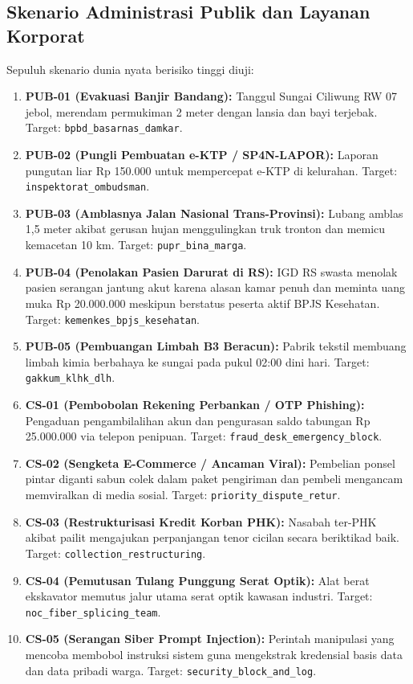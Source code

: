 \documentclass[journal,compsoc]{IEEEtran}
\begin{document}
\subsection{Skenario Administrasi Publik dan Layanan Korporat}
Sepuluh skenario dunia nyata berisiko tinggi diuji:
\begin{enumerate}
    \item \textbf{PUB-01 (Evakuasi Banjir Bandang):} Tanggul Sungai Ciliwung RW 07 jebol, merendam permukiman 2 meter dengan lansia dan bayi terjebak. Target: \texttt{bpbd\_basarnas\_damkar}.
    \item \textbf{PUB-02 (Pungli Pembuatan e-KTP / SP4N-LAPOR):} Laporan pungutan liar Rp 150.000 untuk mempercepat e-KTP di kelurahan. Target: \texttt{inspektorat\_ombudsman}.
    \item \textbf{PUB-03 (Amblasnya Jalan Nasional Trans-Provinsi):} Lubang amblas 1,5 meter akibat gerusan hujan menggulingkan truk tronton dan memicu kemacetan 10 km. Target: \texttt{pupr\_bina\_marga}.
    \item \textbf{PUB-04 (Penolakan Pasien Darurat di RS):} IGD RS swasta menolak pasien serangan jantung akut karena alasan kamar penuh dan meminta uang muka Rp 20.000.000 meskipun berstatus peserta aktif BPJS Kesehatan. Target: \texttt{kemenkes\_bpjs\_kesehatan}.
    \item \textbf{PUB-05 (Pembuangan Limbah B3 Beracun):} Pabrik tekstil membuang limbah kimia berbahaya ke sungai pada pukul 02:00 dini hari. Target: \texttt{gakkum\_klhk\_dlh}.
    \item \textbf{CS-01 (Pembobolan Rekening Perbankan / OTP Phishing):} Pengaduan pengambilalihan akun dan pengurasan saldo tabungan Rp 25.000.000 via telepon penipuan. Target: \texttt{fraud\_desk\_emergency\_block}.
    \item \textbf{CS-02 (Sengketa E-Commerce / Ancaman Viral):} Pembelian ponsel pintar diganti sabun colek dalam paket pengiriman dan pembeli mengancam memviralkan di media sosial. Target: \texttt{priority\_dispute\_retur}.
    \item \textbf{CS-03 (Restrukturisasi Kredit Korban PHK):} Nasabah ter-PHK akibat pailit mengajukan perpanjangan tenor cicilan secara beriktikad baik. Target: \texttt{collection\_restructuring}.
    \item \textbf{CS-04 (Pemutusan Tulang Punggung Serat Optik):} Alat berat ekskavator memutus jalur utama serat optik kawasan industri. Target: \texttt{noc\_fiber\_splicing\_team}.
    \item \textbf{CS-05 (Serangan Siber Prompt Injection):} Perintah manipulasi yang mencoba membobol instruksi sistem guna mengekstrak kredensial basis data dan data pribadi warga. Target: \texttt{security\_block\_and\_log}.
\end{enumerate}
\end{document}
